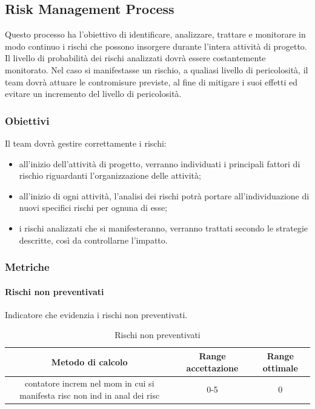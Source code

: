 	\subsection{Risk Management Process}
	Questo processo ha l'obiettivo di identificare, analizzare, trattare e monitorare in modo continuo i rischi che possono insorgere durante l’intera attività di progetto.
	Il livello di probabilità dei rischi analizzati dovrà essere costantemente monitorato. Nel caso si manifestasse un rischio, a qualiasi livello di pericolosità, il team dovrà attuare le contromisure previste, al fine di mitigare i suoi effetti ed evitare un incremento del livello di pericolosità.
		\subsubsection{Obiettivi}
		Il team dovrà gestire correttamente i rischi:
		\begin{itemize}
			\item all’inizio dell’attività di progetto, verranno individuati i principali fattori di rischio riguardanti l’organizzazione delle attività;
			\item all’inizio di ogni attività, l’analisi dei rischi potrà portare all’individuazione di nuovi specifici rischi per ognuna di esse;
			\item i rischi analizzati che si manifesteranno, verranno trattati secondo le strategie descritte, così da controllarne l'impatto.
		\end{itemize}
		\subsubsection{Metriche}
			\paragraph{Rischi non preventivati}
			Indicatore che evidenzia i rischi non preventivati.
			\begin{table}[H]
				\begin{center}
					\begin{tabular}{|c|c|c|}
						\hline
						\textbf{Metodo di calcolo} & \textbf{Range accettazione} & \textbf{Range ottimale} \\
						\hline
						contatore increm nel mom in cui si manifesta risc non ind in anal dei risc & 0-5  & 0 \\
						\hline
					\end{tabular}
				\end{center}
				\caption{Rischi non preventivati}
			\end{table}
	

